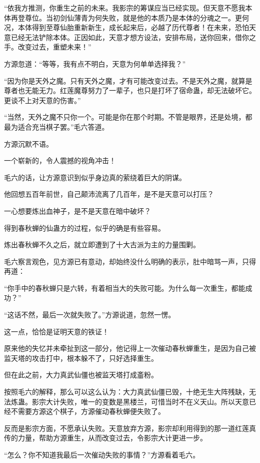 \begin{this_body}
“依我方推测，你重生之前的未来。我影宗的筹谋应当已经实现。但天意不愿我本体再登尊位。当初剑仙薄青为何失败，就是他的本质乃是本体的分魂之一。更何况，本体得到至尊仙胎重新新生，成长起来后，必越了历代尊者！在未来，恐怕天意已经无法铲除本体。正因如此，天意才想方设法，安排布局，送你回来，借你之手。改变过去，重塑未来！”

方源忽道：“等等，我有点不明白，天意为何单单选择我？”

“因为你是天外之魔。只有天外之魔，才有可能改变过去。不是天外之魔，就算是尊者也无能无力。红莲魔尊努力了一辈子，也只是打坏了宿命蛊，却无法破坏它。更谈不上对天意的伤害。”

“当然，天外之魔不只你一个。可能是你在那个时期。不管是眼界，还是处境，都最为适合充当棋子罢。”毛六答道。

方源沉默不语。

一个崭新的，令人震撼的视角冲击！

毛六的话，让方源意识到似乎身边真的萦绕着巨大的阴谋。

他回想五百年前世，自己颠沛流离了几百年，是不是天意可以打压？

一心想要炼出血神子，是不是天意在暗中破坏？

得到春秋蝉的仙蛊方的过程，似乎的确是有些容易。

炼出春秋蝉不久之后，就立即遭到了十大古派为主的力量围剿。

毛六察言观色，见方源已有意动，却始终没什么明确的表示，肚中暗骂一声，只得再道：

“你手中的春秋蝉只是六转，有着相当大的失败可能。为什么每一次重生，都能成功？”

“这话不然，最后一次就失败了。”方源说道，忽然一愣。

这一点，恰恰是证明天意的铁证！

原来他的失忆并未牵扯到这一部分，他记得上一次催动春秋蝉重生，是因为自己被监天塔的攻击打中，根本躲不了，只好选择重生。

但在此之前，大力真武仙僵也被监天塔打成齑粉。

按照毛六的解释，那么可以这么认为：大力真武仙僵已毁，十绝无生大阵残缺，无法炼蛊。影宗大计失败，唯一的变数是黑楼兰，可惜当时不在义天山。所以天意已经不需要方源这个棋子，方源催动春秋蝉便失败了。

反而是影宗方面，不愿承认失败。天意放弃方源，影宗却利用得到的那一道红莲真传的力量，帮助方源重生，从而改变过去，令影宗大计更进一步。

“怎么？你不知道我最后一次催动失败的事情？”方源看着毛六。


\end{this_body}
